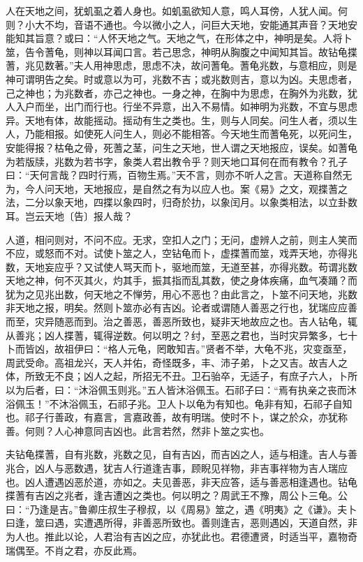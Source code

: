 \documentclass[]{article}
\begin{document}
人在天地之间，犹虮虱之着人身也。如虮虱欲知人意，鸣人耳傍，人犹人闻。何则？小大不均，音语不通也。今以微小之人，问巨大天地，安能通其声音？天地安能知其旨意？或曰：``人怀天地之气。天地之气，在形体之中，神明是矣。人将卜筮，告令蓍龟，则神以耳闻口言。若己思念，神明从胸腹之中闻知其旨。故钻龟揲蓍，兆见数著。''夫人用神思虑，思虑不决，故问蓍龟。蓍龟兆数，与意相应，则是神可谓明告之矣。时或意以为可，兆数不吉；或兆数则吉，意以为凶。夫思虑者，己之神也；为兆数者，亦己之神也。一身之神，在胸中为思虑，在胸外为兆数，犹人入户而坐，出门而行也。行坐不异意，出入不易情。如神明为兆数，不宜与思虑异。天地有体，故能摇动。摇动有生之类也。生，则与人同矣。问生人者，须以生人，乃能相报。如使死人问生人，则必不能相答。今天地生而蓍龟死，以死问生，安能得报？枯龟之骨，死蓍之茎，问生之天地，世人谓之天地报应，误矣。如蓍龟为若版牍，兆数为若书字，象类人君出教令乎？则天地口耳何在而有教令？孔子曰：``天何言哉？四时行焉，百物生焉。''天不言，则亦不听人之言。天道称自然无为，今人问天地，天地报应，是自然之有为以应人也。案《易》之文，观揲蓍之法，二分以象天地，四揲以象四时，归奇於扐，以象闰月。以象类相法，以立卦数耳。岂云天地〔告〕报人哉？

人道，相问则对，不问不应。无求，空扣人之门；无问，虚辨人之前，则主人笑而不应，或怒而不对。试使卜筮之人，空钻龟而卜，虚揲蓍而筮，戏弄天地，亦得兆数，天地妄应乎？又试使人骂天而卜，驱地而筮，无道至甚，亦得兆数。苟谓兆数天地之神，何不灭其火，灼其手，振其指而乱其数，使之身体疾痛，血气凑踊？而犹为之见兆出数，何天地之不惮劳，用心不恶也？由此言之，卜筮不问天地，兆数非天地之报，明矣。然则卜筮亦必有吉凶。论者或谓随人善恶之行也，犹瑞应应善而至，灾异随恶而到。治之善恶，善恶所致也，疑非天地故应之也。吉人钻龟，辄从善兆；凶人揲蓍，辄得逆数。何以明之？纣，至恶之君也，当时灾异繁多，七十卜而皆凶，故祖伊曰：``格人元龟，罔敢知吉。''贤者不举，大龟不兆，灾变亟至，周武受命。高祖龙兴，天人并佑，奇怪既多，丰、沛子弟，卜之又吉。故吉人之体，所致无不良；凶人之起，所招无不丑。卫石骀卒，无适子，有庶子六人，卜所以为后者，曰：``沐浴佩玉则兆。''五人皆沐浴佩玉。石祁子曰：``焉有执亲之丧而沐浴佩玉！''不沐浴佩玉，石祁子兆。卫人卜以龟为有知也。龟非有知，石祁子自知也。祁子行善政，有嘉言，言嘉政善，故有明瑞。使时不卜，谋之於众，亦犹称善。何则？人心神意同吉凶也。此言若然，然非卜筮之实也。

夫钻龟揲蓍，自有兆数，兆数之见，自有吉凶，而吉凶之人，适与相逢。吉人与善兆合，凶人与恶数遇，犹吉人行道逢吉事，顾睨见祥物，非吉事祥物为吉人瑞应也。凶人遭遇凶恶於道，亦如之。夫见善恶，非天应答，适与善恶相逢遇也。钻龟揲蓍有吉凶之兆者，逢吉遭凶之类也。何以明之？周武王不豫，周公卜三龟。公曰：``乃逢是吉。''鲁卿庄叔生子穆叔，以《周易》筮之，遇《明夷》之《谦》。夫卜曰逢，筮曰遇，实遭遇所得，非善恶所致也。善则逢吉，恶则遇凶，天道自然，非为人也。推此以论，人君治有吉凶之应，亦犹此也。君德遭贤，时适当平，嘉物奇瑞偶至。不肖之君，亦反此焉。
\end{document}
